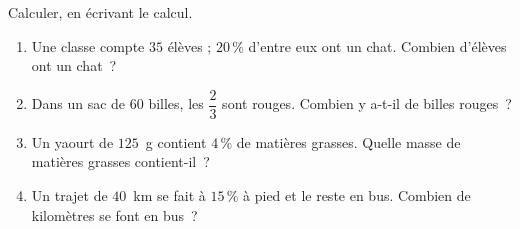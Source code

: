 \documentclass[a4paper,11pt,fleqn]{article}
\newcommand{\ligne}{\par\smallskip\makebox[\linewidth]{\dotfill}\par}
\begin{document}
\begin{EXO}{}{}
Calculer, en écrivant le calcul.
\begin{enumerate}[itemsep=0.3em]
	\item Une classe compte $35$ élèves ; $20\,\%$ d'entre eux ont un chat. Combien d'élèves ont un chat~?
	\ligne
	\item Dans un sac de $60$ billes, les $\dfrac{2}{3}$ sont rouges. Combien y a-t-il de billes rouges~?
	\ligne
	\item Un yaourt de $125$~g contient $4\,\%$ de matières grasses. Quelle masse de matières grasses contient-il~?
	\ligne
	\item Un trajet de $40$~km se fait à $15\,\%$ à pied et le reste en bus. Combien de kilomètres se font en bus~?
	\ligne
\end{enumerate}
\end{EXO}

\ifdefined\ELEVE\else
\clearpage
\end{document}
